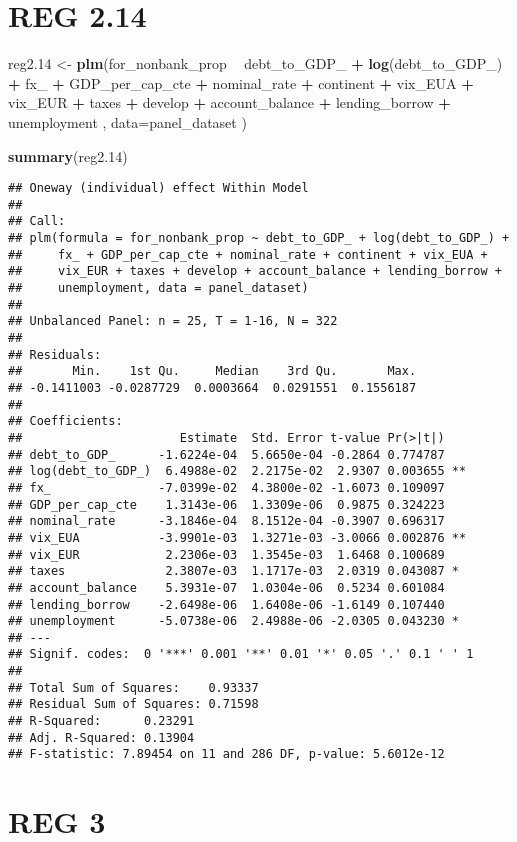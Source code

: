 \documentclass[]{article}
\newenvironment{Shaded}{\begin{snugshade}}{\end{snugshade}}
\newcommand{\KeywordTok}[1]{\textcolor[rgb]{0.13,0.29,0.53}{\textbf{#1}}}
\newcommand{\DataTypeTok}[1]{\textcolor[rgb]{0.13,0.29,0.53}{#1}}
\newcommand{\DecValTok}[1]{\textcolor[rgb]{0.00,0.00,0.81}{#1}}
\newcommand{\StringTok}[1]{\textcolor[rgb]{0.31,0.60,0.02}{#1}}
\newcommand{\OperatorTok}[1]{\textcolor[rgb]{0.81,0.36,0.00}{\textbf{#1}}}
\newcommand{\NormalTok}[1]{#1}
\begin{document}
\section{REG 2.14}\label{reg-2.14}

\begin{Shaded}
\begin{Highlighting}[]
\NormalTok{reg2.}\DecValTok{14}\NormalTok{ <-}\StringTok{ }\KeywordTok{plm}\NormalTok{(for_nonbank_prop }\OperatorTok{~}\StringTok{  }\NormalTok{debt_to_GDP_ }\OperatorTok{+}\StringTok{ }\KeywordTok{log}\NormalTok{(debt_to_GDP_) }\OperatorTok{+}\StringTok{ }\NormalTok{fx_ }\OperatorTok{+}\StringTok{ }\NormalTok{GDP_per_cap_cte }\OperatorTok{+}\StringTok{  }\NormalTok{nominal_rate }\OperatorTok{+}\StringTok{ }\NormalTok{continent }\OperatorTok{+}\StringTok{ }\NormalTok{vix_EUA }\OperatorTok{+}\StringTok{ }\NormalTok{vix_EUR }\OperatorTok{+}\StringTok{ }\NormalTok{taxes }\OperatorTok{+}\StringTok{ }\NormalTok{develop }\OperatorTok{+}\StringTok{ }\NormalTok{account_balance }\OperatorTok{+}\StringTok{ }\NormalTok{lending_borrow }\OperatorTok{+}\StringTok{ }\NormalTok{unemployment , }\DataTypeTok{data=}\NormalTok{panel_dataset  )}

\KeywordTok{summary}\NormalTok{(reg2.}\DecValTok{14}\NormalTok{)}
\end{Highlighting}
\end{Shaded}

\begin{verbatim}
## Oneway (individual) effect Within Model
## 
## Call:
## plm(formula = for_nonbank_prop ~ debt_to_GDP_ + log(debt_to_GDP_) + 
##     fx_ + GDP_per_cap_cte + nominal_rate + continent + vix_EUA + 
##     vix_EUR + taxes + develop + account_balance + lending_borrow + 
##     unemployment, data = panel_dataset)
## 
## Unbalanced Panel: n = 25, T = 1-16, N = 322
## 
## Residuals:
##       Min.    1st Qu.     Median    3rd Qu.       Max. 
## -0.1411003 -0.0287729  0.0003664  0.0291551  0.1556187 
## 
## Coefficients:
##                      Estimate  Std. Error t-value Pr(>|t|)   
## debt_to_GDP_      -1.6224e-04  5.6650e-04 -0.2864 0.774787   
## log(debt_to_GDP_)  6.4988e-02  2.2175e-02  2.9307 0.003655 **
## fx_               -7.0399e-02  4.3800e-02 -1.6073 0.109097   
## GDP_per_cap_cte    1.3143e-06  1.3309e-06  0.9875 0.324223   
## nominal_rate      -3.1846e-04  8.1512e-04 -0.3907 0.696317   
## vix_EUA           -3.9901e-03  1.3271e-03 -3.0066 0.002876 **
## vix_EUR            2.2306e-03  1.3545e-03  1.6468 0.100689   
## taxes              2.3807e-03  1.1717e-03  2.0319 0.043087 * 
## account_balance    5.3931e-07  1.0304e-06  0.5234 0.601084   
## lending_borrow    -2.6498e-06  1.6408e-06 -1.6149 0.107440   
## unemployment      -5.0738e-06  2.4988e-06 -2.0305 0.043230 * 
## ---
## Signif. codes:  0 '***' 0.001 '**' 0.01 '*' 0.05 '.' 0.1 ' ' 1
## 
## Total Sum of Squares:    0.93337
## Residual Sum of Squares: 0.71598
## R-Squared:      0.23291
## Adj. R-Squared: 0.13904
## F-statistic: 7.89454 on 11 and 286 DF, p-value: 5.6012e-12
\end{verbatim}

\section{REG 3}\label{reg-3}
\end{document}
